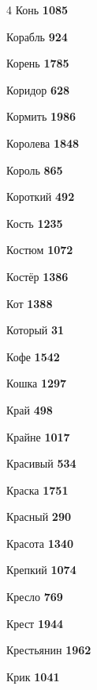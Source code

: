 \begin{multicols}{4}
\noindent Конь \dotfill \textbf{\color{secondary} 1085}\par
\noindent Корабль \dotfill \textbf{\color{secondary} 924}\par
\noindent Корень \dotfill \textbf{\color{secondary} 1785}\par
\noindent Коридор \dotfill \textbf{\color{secondary} 628}\par
\noindent Кормить \dotfill \textbf{\color{secondary} 1986}\par
\noindent Королева \dotfill \textbf{\color{secondary} 1848}\par
\noindent Король \dotfill \textbf{\color{secondary} 865}\par
\noindent Короткий \dotfill \textbf{\color{secondary} 492}\par
\noindent Кость \dotfill \textbf{\color{secondary} 1235}\par
\noindent Костюм \dotfill \textbf{\color{secondary} 1072}\par
\noindent Костёр \dotfill \textbf{\color{secondary} 1386}\par
\noindent Кот \dotfill \textbf{\color{secondary} 1388}\par
\noindent Который \dotfill \textbf{\color{secondary} 31}\par
\noindent Кофе \dotfill \textbf{\color{secondary} 1542}\par
\noindent Кошка \dotfill \textbf{\color{secondary} 1297}\par
\noindent Край \dotfill \textbf{\color{secondary} 498}\par
\noindent Крайне \dotfill \textbf{\color{secondary} 1017}\par
\noindent Красивый \dotfill \textbf{\color{secondary} 534}\par
\noindent Краска \dotfill \textbf{\color{secondary} 1751}\par
\noindent Красный \dotfill \textbf{\color{secondary} 290}\par
\noindent Красота \dotfill \textbf{\color{secondary} 1340}\par
\noindent Крепкий \dotfill \textbf{\color{secondary} 1074}\par
\noindent Кресло \dotfill \textbf{\color{secondary} 769}\par
\noindent Крест \dotfill \textbf{\color{secondary} 1944}\par
\noindent Крестьянин \dotfill \textbf{\color{secondary} 1962}\par
\noindent Крик \dotfill \textbf{\color{secondary} 1041}\par

\end{multicols}

